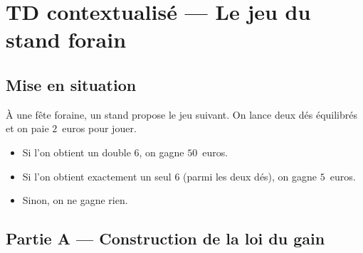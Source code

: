 

\section*{TD contextualisé — Le jeu du stand forain}

\subsection*{Mise en situation}

À une fête foraine, un stand propose le jeu suivant. On lance deux dés équilibrés et on paie $2$~euros pour jouer.
\begin{itemize}
  \item Si l'on obtient un double $6$, on gagne $50$~euros.
  \item Si l'on obtient exactement un seul $6$ (parmi les deux dés), on gagne $5$~euros.
  \item Sinon, on ne gagne rien.
\end{itemize}

\bigskip

\subsection*{Partie A — Construction de la loi du gain}

